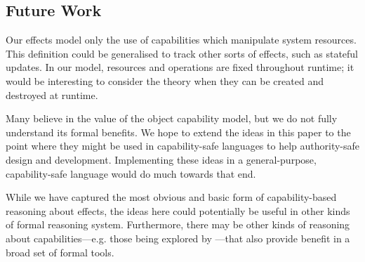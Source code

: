 \subsection{Future Work}

Our effects model only the use of capabilities which manipulate system resources. This definition could be generalised to track other sorts of effects, such as stateful updates. In our model, resources and operations are fixed throughout runtime; it would be interesting to consider the theory when they can be created and destroyed at runtime.

Many believe in the value of the object capability model, but we do not fully understand its formal benefits. We hope to extend the ideas in this paper to the point where they might be used in capability-safe languages to help authority-safe design and development. Implementing these ideas in a general-purpose, capability-safe language would do much towards that end.

While we have captured the most obvious and basic form of capability-based reasoning about effects, the ideas here could potentially be useful in other kinds of formal reasoning system.
Furthermore, there may be other kinds of reasoning about capabilities---e.g. those being explored by \citet{drossopoulou07}---that also provide benefit in a broad set of formal tools.

